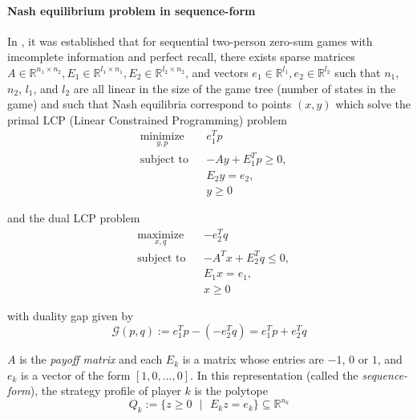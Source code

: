 \documentclass{article} %
\begin{document}
\paragraph{Nash equilibrium problem in sequence-form}
In \cite{von1996efficient, vonequilibrium}, it was established that for sequential two-person zero-sum games with imcomplete information and perfect recall, there exists sparse matrices $A \in \mathbb{R}^{n_1 \times n_2}, E_1 \in \mathbb{R}^{l_1 \times n_1}, E_2 \in \mathbb{R}^{l_2 \times n_2}$, and vectors $e_1 \in \mathbb{R}^{l_1}, e_2 \in \mathbb{R}^{l_2}$ such that $n_1$, $n_2$, $l_1$, and $l_2$ are all linear in the size of the game tree (number of states in the game) and such that Nash equilibria correspond to points $(x, y)$ which solve the primal LCP (Linear Constrained Programming) problem
\begin{equation}
  \begin{aligned}
    & \underset{y,p}{\text{minimize}}
    & & e_1^Tp \\
    & \text{subject to}
    & & -Ay + E_1^Tp \geq 0,\\
    &&& E_2y = e_2,\\
    &&& y \ge 0
  \end{aligned}
  \label{eq:primal_pb}
\end{equation}

and the dual LCP problem
\begin{equation}
  \begin{aligned}
    & \underset{x,q}{\text{maximize}}
    & & -e_2^Tq \\
    & \text{subject to}
    & & -A^Tx + E_2^Tq \leq 0,\\
    &&& E_1x = e_1,\\
    &&& x \ge 0
  \end{aligned}
  \label{eq:dual_pb}
\end{equation}

with duality gap given by
\begin{equation}
  \mathcal{G}(p, q) := e_1^Tp - (-e_2^Tq) = e_1^Tp + e_2^Tq
  \label{eq:dgap}
\end{equation}

$A$ is the \textit{payoff matrix} and each $E_k$ is a matrix whose entries are $-1$, $0$ or $1$, and $e_k$ is a vector of the form $[1, 0, ..., 0]$. In this representation (called the \textit{sequence-form}), the strategy profile of player $k$ is the polytope
\begin{equation}
  Q_k := \{z \ge 0\text{ }|\text{ }E_kz = e_k\} \subseteq \mathbb{R}^{n_k}
\end{equation}
\end{document}
